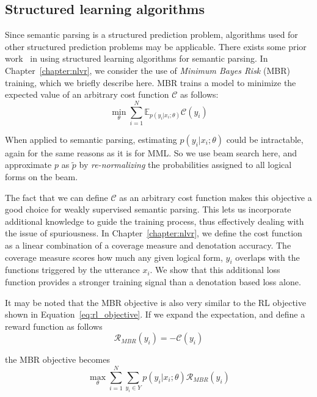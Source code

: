 \subsection{Structured learning algorithms}\label{sec:erm}
Since semantic parsing is a structured prediction problem, algorithms used for
other structured prediction problems may be applicable. 
There exists some prior work~\citep{IyyerSQA2016,guu2017bridging} in using 
structured learning algorithms for semantic parsing. In
Chapter~\ref{chapter:nlvr}, we consider the use of
\emph{Minimum Bayes Risk} (MBR)~\citep{goodman1996parsing,goel2000minimum,smith2006minimum}
training, which we briefly describe here.
MBR trains a model to minimize the
expected value of an arbitrary cost function $\mathcal{C}$ as follows:
\begin{equation}
\min_{\theta} \sum_{i=1}^{N} \mathbb{E}_{p(y_i|x_i;
\theta)}\mathcal{C}(y_i) \label{eq:erm_objective}
\end{equation}

\noindent When applied to semantic parsing, estimating $p(y_i|x_i; \theta)$
could be intractable, again for the same reasons as it is for MML\@. So we use
beam search here, and approximate $p$ as $\tilde{p}$ by \emph{re-normalizing}
the probabilities assigned to all logical forms on the beam.

The fact that we can define $\mathcal{C}$ as an arbitrary cost function makes
this objective a good choice for weakly supervised semantic parsing. This lets
us incorporate additional knowledge to guide the training process,
thus effectively dealing with the issue of spuriousness. In
Chapter~\ref{chapter:nlvr}, we define the cost function as a linear combination
of a coverage measure and denotation accuracy. The coverage measure scores how
much any given logical form, $y_i$ overlaps with the functions triggered by the
utterance $x_i$. We show that this additional loss function provides a 
stronger training signal than a denotation based loss alone.

It may be noted that the MBR objective is also very similar to the RL objective
shown in Equation~\ref{eq:rl_objective}. If we expand the expectation, and 
define a reward function as follows
\begin{equation}
	\mathcal{R}_{MBR}(y_i) = -\mathcal{C}(y_i)
\end{equation}

\noindent the MBR objective becomes
\begin{equation}
	\max_{\theta} \sum_{i=1}^{N} \sum_{y_i \in Y} p(y_i|x_i;\theta)
	\mathcal{R}_{MBR}(y_i) \label{eq:erm_objective2}	
\end{equation}

